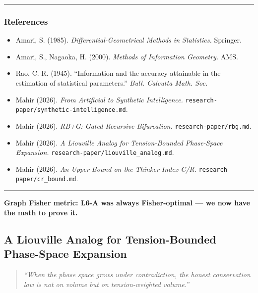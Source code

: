 \documentclass[
  11pt,
  a4paper,
]{article}
\providecommand{\tightlist}{%
  \setlength{\itemsep}{0pt}\setlength{\parskip}{0pt}}
\begin{document}
\begin{center}\rule{0.5\linewidth}{0.5pt}\end{center}

\subsubsection{References}\label{references-3}

\begin{itemize}
\tightlist
\item
  Amari, S. (1985). \emph{Differential-Geometrical Methods in
  Statistics.} Springer.
\item
  Amari, S., Nagaoka, H. (2000). \emph{Methods of Information Geometry.}
  AMS.
\item
  Rao, C. R. (1945). ``Information and the accuracy attainable in the
  estimation of statistical parameters.'' \emph{Bull. Calcutta Math.
  Soc.}
\item
  Mahir (2026). \emph{From Artificial to Synthetic Intelligence.}
  \texttt{research-paper/synthetic-intelligence.md}.
\item
  Mahir (2026). \emph{RB+G: Gated Recursive Bifurcation.}
  \texttt{research-paper/rbg.md}.
\item
  Mahir (2026). \emph{A Liouville Analog for Tension-Bounded Phase-Space
  Expansion.} \texttt{research-paper/liouville\_analog.md}.
\item
  Mahir (2026). \emph{An Upper Bound on the Thinker Index C/R.}
  \texttt{research-paper/cr\_bound.md}.
\end{itemize}

\begin{center}\rule{0.5\linewidth}{0.5pt}\end{center}

\textbf{Graph Fisher metric: L6-A was always Fisher-optimal --- we now
have the math to prove it.}

\newpage

\subsection{A Liouville Analog for Tension-Bounded Phase-Space
Expansion}\label{a-liouville-analog-for-tension-bounded-phase-space-expansion}

\begin{quote}
\emph{``When the phase space grows under contradiction, the honest
conservation law is not on volume but on tension-weighted volume.''}
\end{quote}
\end{document}
